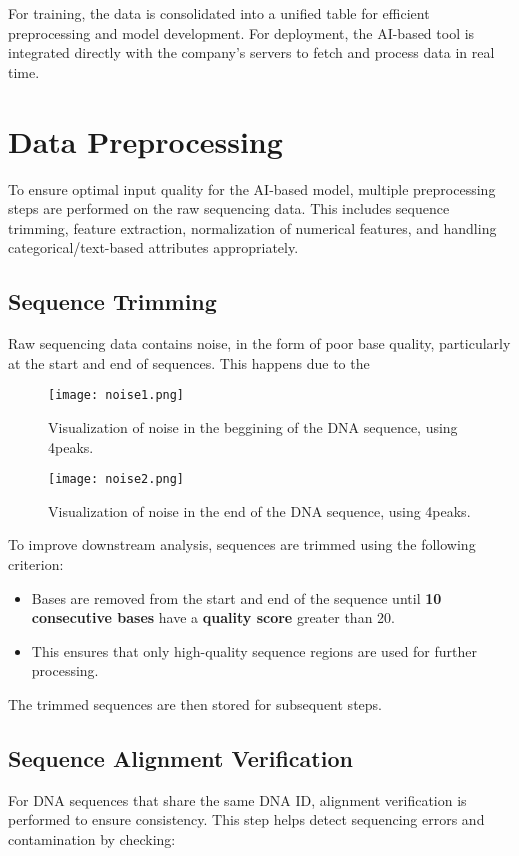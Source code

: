 For training, the data is consolidated into a unified table for efficient preprocessing and model development. For deployment, the AI-based tool is integrated directly with the company's servers to fetch and process data in real time.

\section{Data Preprocessing}
\label{sec:data_preprocessing}

To ensure optimal input quality for the AI-based model, multiple preprocessing steps are performed on the raw sequencing data. This includes sequence trimming, feature extraction, normalization of numerical features, and handling categorical/text-based attributes appropriately.

\subsection{Sequence Trimming}
Raw sequencing data contains noise, in the form of poor base quality, particularly at the start and end of sequences. This happens due to the 

\begin{figure}[h]
  \centering
  \texttt{[image: noise1.png]}
  \caption{Visualization of noise in the beggining of the DNA sequence, using 4peaks.}
  \label{fig:noise1}
\end{figure}

\begin{figure}[h]
  \centering
  \texttt{[image: noise2.png]}
  \caption{Visualization of noise in the end of the DNA sequence, using 4peaks.}
  \label{fig:noise2}
\end{figure}

To improve downstream analysis, sequences are trimmed using the following criterion:

\begin{itemize}
    \item Bases are removed from the start and end of the sequence until \textbf{10 consecutive bases} have a \textbf{quality score} greater than 20.
    \item This ensures that only high-quality sequence regions are used for further processing.
\end{itemize}

The trimmed sequences are then stored for subsequent steps.

\subsection{Sequence Alignment Verification}
For DNA sequences that share the same DNA ID, alignment verification is performed to ensure consistency. This step helps detect sequencing errors and contamination by checking:

